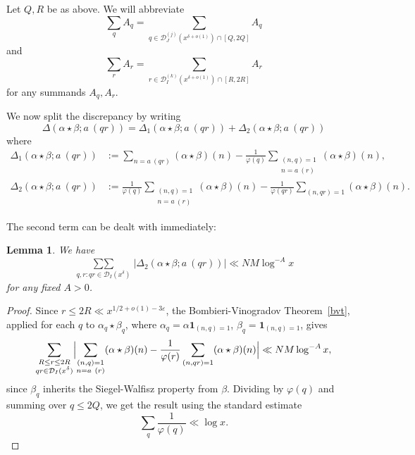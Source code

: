 \documentclass[12pt,a4paper,reqno]{amsart}
\numberwithin{equation}{section}
\theoremstyle{plain}
\newtheorem{lemma}[theorem]{Lemma}
\theoremstyle{definition}
\newcommand\eps{\varepsilon}
\newcommand{\DI}[3]{\mathcal{D}_{{#1}}^{({#2})}({#3})}
\newcommand{\DIone}[2]{\mathcal{D}_{{#1}}({#2})}
\newcommand\sumsum{\mathop{\sum\sum}\limits}
\renewcommand{\phi}{\varphi}
\newcommand{\onef}{\mathbf{1}}
\begin{document}
Let $Q,R$ be as above.  We will abbreviate
\begin{equation}\label{q-sum}
  \sum_q A_q= \sum_{q \in \DI{J}{j}{x^{\delta+o(1)}} \cap [Q,2Q]} A_q
\end{equation}
and
\begin{equation}\label{r-sum}
  \sum_r A_r= \sum_{r \in \DI{I}{k}{x^{\delta+o(1)}} \cap [R,2R]} A_r
\end{equation}
for any summands $A_q,A_r$.

We now split the discrepancy by writing
$$ 
\Delta(\alpha \star \beta; a\ (qr)) = 
\Delta_1(\alpha \star \beta; a\ (qr))+
\Delta_2(\alpha \star \beta; a\ (qr))
$$
where
\begin{align*}
  \Delta_1(\alpha \star \beta; a\ (qr))&:= \sum_{n = a\ (qr)} (\alpha
  \star \beta)(n) - \frac{1}{\phi(q)}
  \sum_{\substack{(n,q)=1\\ n = a\ (r)}} (\alpha \star \beta)(n),\\
  \Delta_2(\alpha \star \beta; a\ (qr))&:= \frac{1}{\phi(q)}
  \sum_{\substack{(n,q)=1\\n = a\ (r)}} (\alpha \star \beta)(n) -
  \frac{1}{\phi(qr)} \sum_{(n,qr)=1} (\alpha \star \beta)(n).
\end{align*}

The second term can be dealt with immediately: 

\begin{lemma} We have
$$
\sumsum_{q,r:qr \in \DIone{I}{x^\delta}}| \Delta_2(\alpha \star \beta;
a\ (qr))| \ll NM \log^{-A} x
$$
for any fixed $A>0$.
\end{lemma}

\begin{proof}
  Since $r\leq 2R\ll x^{1/2+o(1)-3\eps}$, the Bombieri-Vinogradov
  Theorem~\ref{bvt}, applied for each $q$ to $\alpha_q\star \beta_q$,
  where $\alpha_q=\alpha\onef_{(n,q)=1}$, $\beta_q=\onef_{(n,q)=1}$,
  gives
$$
\sum_{\substack{R\leq r\leq 2R\\qr \in \DIone{I}{x^\delta}}}
\Bigl|\sum_{\substack{(n,q)=1\\ n = a\ (r)}} (\alpha \star \beta)(n) -
\frac{1}{\phi(r)} \sum_{(n,qr)=1} (\alpha \star \beta)(n)\Bigr| \ll NM
\log^{-A} x,
$$
since $\beta_q$ inherits the Siegel-Walfisz property from
$\beta$. Dividing by $\phi(q)$ and summing over $q\leq 2Q$, we get the
result using the standard estimate 
$$
\sum_q \frac{1}{\phi(q)} \ll \log x.
$$
\end{proof}
\end{document}
